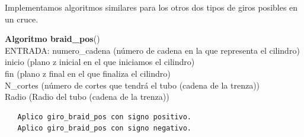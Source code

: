 \bigskip
Implementamos algoritmos similares para los otros dos tipos de giros posibles en un cruce. 
  \begin{alg}
  	\textbf{Algoritmo braid\_pos}()\\
  	ENTRADA: numero\_cadena (número de cadena en la que representa el cilindro)\\
  	\hspace*{2.2cm} inicio (plano z inicial en el que iniciamos el cilindro)\\
  	\hspace*{2.2cm} fin (plano z final en el que finaliza el cilindro)\\
  	\hspace*{2.2cm} N\_cortes (número de cortes que tendrá el tubo (cadena de la trenza))\\
  	\hspace*{2.2cm} Radio (Radio del tubo (cadena de la trenza))
  	
\begin{lstlisting}
   Aplico giro_braid_pos con signo positivo.
   Aplico giro_braid_pos con signo negativo.  
\end{lstlisting}
  \end{alg}
  
